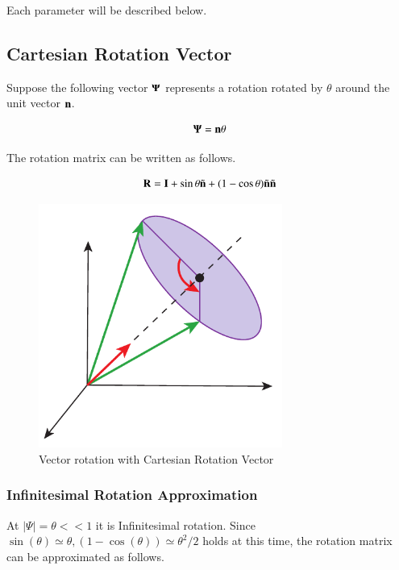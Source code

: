 Each parameter will be described below.


\subsection{Cartesian Rotation Vector}

Suppose the following vector $\mathbf{\Psi}$ represents a rotation rotated by $\theta$ around the unit vector $\mathbf{n}$.

\begin{equation}
\mathbf{\Psi} = \mathbf{n}\theta
\end{equation}

The rotation matrix can be written as follows.

\begin{tcolorbox}[title=rotation matrix]
\begin{equation}
\mathbf{R} = \mathbf{I} + \sin\theta\tilde{\mathbf{n}} + (1-\cos\theta)\tilde{\mathbf{n}}\tilde{\mathbf{n}}
\end{equation}
\end{tcolorbox}


\begin{figure}
\begin{center}
\includegraphics[width=80mm]{images/CartesianRotation.pdf}
\caption{Vector rotation with Cartesian Rotation Vector}
\end{center}
\end{figure}

\subsubsection{Infinitesimal Rotation Approximation}

At $|\Psi|=\theta<<1$ it is Infinitesimal rotation. Since $\sin(\theta)\simeq\theta,(1-\cos(\theta))\simeq\theta^2/2$ holds at this time, the rotation matrix can be approximated as follows.


